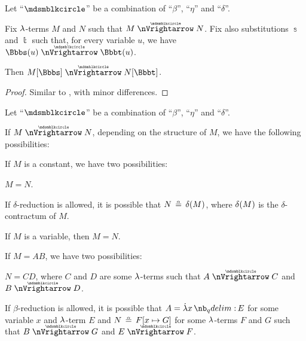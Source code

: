 \begin{proposition}\label{thm:substitution_on_parallel_reduction}
  Let \enquote{\( {\Anon} \)} be a combination of \enquote{\( \beta \)}, \enquote{\( \eta \)} and \enquote{\( \delta \)}.

  Fix \( {\mathrm \lambda} \)-terms \( M \) and \( N \) such that \( M \ppred N \). Fix also substitutions \( \Bbbs \) and \( \Bbbt \) such that, for every variable \( u \), we have \( \Bbbs(u) \ppred \Bbbt(u) \).

  Then \( M[\Bbbs] \ppred N[\Bbbt] \).
\end{proposition}
\begin{proof}
  Similar to , with minor differences.
\end{proof}

\begin{lemma}\label{thm:parallel_reduction_deconstruction}
  Let \enquote{\( {\Anon} \)} be a combination of \enquote{\( \beta \)}, \enquote{\( \eta \)} and \enquote{\( \delta \)}.

  If \( M \ppred N \), depending on the structure of \( M \), we have the following possibilities:
  \begin{thmenum}
     If \( M \) is a constant, we have two possibilities:
    \begin{thmenum}
       \( M = N \).

       If \( \delta \)-reduction is allowed, it is possible that \( N \aequiv \op*{\delta}(M) \), where \( \op*{\delta}(M) \) is the \( \delta \)-contractum  of \( M \).
    \end{thmenum}

     If \( M \) is a variable, then \( M = N \).

     If \( M = AB \), we have two possibilities:
    \begin{thmenum}
       \( N = CD \), where \( C \) and \( D \) are some \( {\mathrm \lambda} \)-terms such that \( A \ppred C \) and \( B \ppred D \).

       If \( \beta \)-reduction is allowed, it is possible that \( A = \qabs x E \) for some variable \( x \) and \( {\mathrm \lambda} \)-term \( E \) and \( N \aequiv F[x \mapsto G] \) for some \( {\mathrm \lambda} \)-terms \( F \) and \( G \) such that \( B \ppred G \) and \( E \ppred F \).
    \end{thmenum}


\end{thmenum}
\end{lemma}
